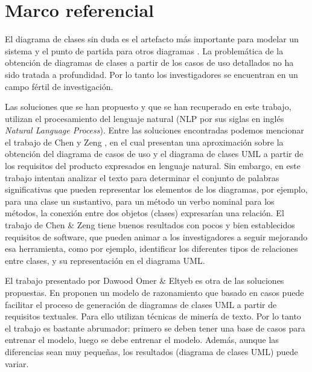 \section{Marco referencial}

El diagrama de clases sin duda es el artefacto más importante para modelar un sistema y el punto de partida para otros diagramas \cite{Tan2010}. La problemática de la obtención de diagramas de clases a partir de los casos de uso detallados no ha sido tratada a profundidad. Por lo tanto los investigadores se encuentran en un campo fértil de investigación.

Las soluciones que se han propuesto y que se han recuperado en este trabajo, utilizan el procesamiento del lenguaje natural (NLP por sus siglas en inglés \textit{Natural Language Process}). Entre las soluciones encontradas podemos mencionar el trabajo de Chen y Zeng \cite{Chen2010}, en el cual presentan una aproximación sobre la obtención del diagrama de casos de uso y el diagrama de clases UML a partir de los requisitos del producto expresados en lenguaje natural. Sin embargo, en este trabajo intentan analizar el texto para determinar el conjunto de palabras significativas que pueden representar los elementos de los diagramas, por ejemplo, para una clase un sustantivo, para un método un verbo nominal para los métodos, la conexión entre dos objetos (clases) expresarían una relación. El trabajo de Chen \& Zeng \cite{Chen2010} tiene buenos resultados con pocos y bien establecidos requisitos de software, que pueden animar a los investigadores a seguir mejorando esa herramienta, como por ejemplo, identificar los diferentes tipos de relaciones entre clases, y su representación en el diagrama UML.

El trabajo presentado por Dawood Omer \& Eltyeb \cite{Dawood2022} es otra de las soluciones propuestas. En \cite{Dawood2022} proponen un modelo de razonamiento que basado en casos puede facilitar el proceso de generación de diagramas de clases UML a partir de requisitos textuales. Para ello utilizan técnicas de minería de texto. Por lo tanto el trabajo es bastante abrumador: primero se deben tener una base de casos para entrenar el modelo, luego se debe entrenar el modelo. Además, aunque las diferencias sean muy pequeñas, los resultados (diagrama de clases UML) puede variar.

